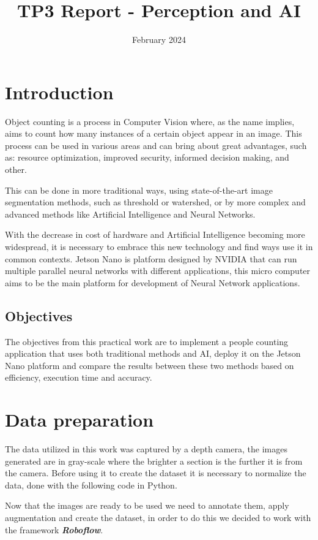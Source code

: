 \documentclass[conference]{IEEEtran}
\title{TP3 Report - Perception and AI}
\author{\IEEEauthorblockN{Bruno Luiz Dias Alves de Castro}
\IEEEauthorblockA{\textit{ESIEE Paris}}
\and
\IEEEauthorblockN{Victor Gabriel Mendes Sündermann}
\IEEEauthorblockA{\textit{ESIEE Paris}}
}
\date{February 2024}
\begin{document}
\maketitle

\section{Introduction}

Object counting is a process in Computer Vision where, as the name implies, aims to count how many instances of a certain object appear in an image. This process can be used in various areas and can bring about great advantages, such as: resource optimization, improved security, informed decision making, and other.

This can be done in more traditional ways, using state-of-the-art image segmentation methods, such as threshold or watershed, or by more complex and advanced methods like Artificial Intelligence and Neural Networks.

With the decrease in cost of hardware and Artificial Intelligence becoming more widespread, it is necessary to embrace this new technology and find ways use it in common contexts. Jetson Nano is platform designed by NVIDIA that can run multiple parallel neural networks with different applications, this micro computer aims to be the main platform for development of Neural Network applications.
\subsection{Objectives}

The objectives from this practical work are to implement a people counting application that uses both traditional methods and AI, deploy it on the Jetson Nano platform and compare the results between these two methods based on efficiency, execution time and accuracy.

\section{Data preparation}

The data utilized in this work was captured by a depth camera, the images generated are in gray-scale where the brighter a section is the further it is from the camera. Before using it to create the dataset it is necessary to normalize the data, done with the following code in Python.

Now that the images are ready to be used we need to annotate them, apply augmentation and create the dataset, in order to do this we decided to work with the framework \textit{\textbf{Roboflow}}.
\end{document}
